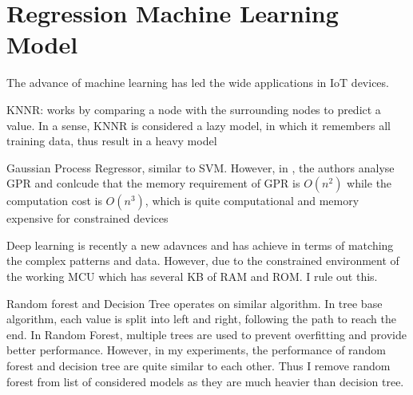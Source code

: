 \section{Regression Machine Learning Model}
The advance of machine learning has led the wide applications in IoT devices.

KNNR: works by comparing a node with the surrounding nodes to predict a value. In a sense, KNNR is considered a lazy model, in which it remembers all training data, thus result in a heavy model

Gaussian Process Regressor, similar to SVM. However, in \cite{}, the authors analyse GPR and conlcude that the memory requirement of GPR is $O(n^2)$ while the computation cost is $O(n^3)$, which is quite computational and memory expensive for constrained devices

Deep learning is recently a new adavnces and has achieve in terms of matching the complex patterns and data. However, due to the constrained environment of the working MCU which has several KB of RAM and ROM. I rule out this.

Random forest and Decision Tree operates on similar algorithm. In tree base algorithm, each value is split into left and right, following the path to reach the end. In Random Forest, multiple trees are used to prevent overfitting and provide better performance. However, in my experiments, the performance of random forest and decision tree are quite similar to each other. Thus I remove random forest from list of considered models as they are much heavier than decision tree.
